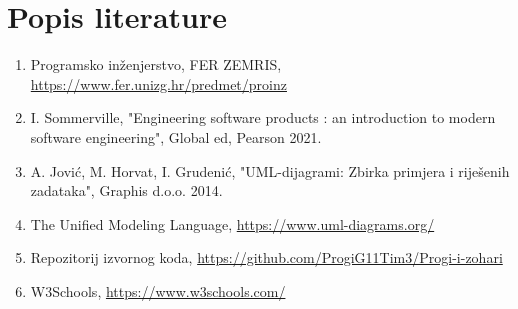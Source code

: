 \chapter*{Popis literature}
		
		
		\begin{enumerate}
			
			
			\item  Programsko inženjerstvo, FER ZEMRIS, \url{https://www.fer.unizg.hr/predmet/proinz}
			
			\item  I. Sommerville, "Engineering software products : an introduction to modern software engineering", Global ed, Pearson 2021.
			
			\item  A. Jović, M. Horvat, I. Grudenić, "UML-dijagrami: Zbirka primjera i riješenih zadataka", Graphis d.o.o. 2014.
			
			\item  The Unified Modeling Language, \url{https://www.uml-diagrams.org/}
			
			\item  Repozitorij izvornog koda, \url{https://github.com/ProgiG11Tim3/Progi-i-zohari}
			
			\item  W3Schools, \url{https://www.w3schools.com/}
		\end{enumerate}
		
		 